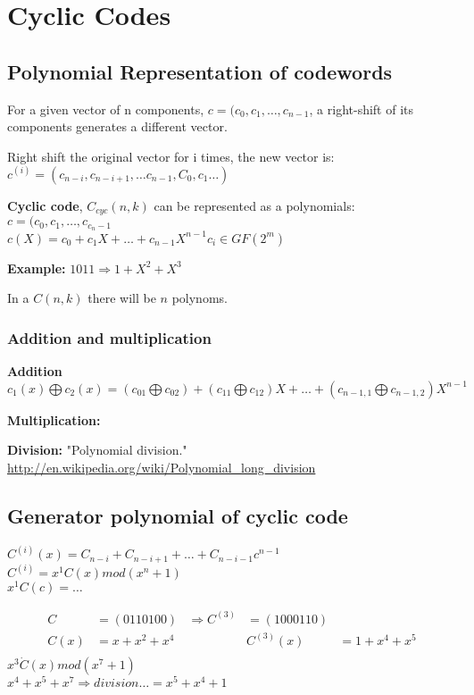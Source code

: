\documentclass[Main]{subfiles}
\begin{document}
 
\chapter{Cyclic Codes}

\section{Polynomial Representation of codewords}
For a given vector of n components, $c = (c_0 , c_1, \ldots, c_{n-1}$, a right-shift of its components generates a different vector.

Right shift the original vector for i times, the new vector is:
\\
$c^{(i)} = (c_{n-i}, c_{n-i+1}, \ldots c_{n-1}, C_0, c_1 \ldots)$

\textbf{Cyclic code}, $C_{cyc}(n,k)$ can be represented as a polynomials:
\\
$c=(c_0,c_1,\ldots, c_{c_n-1}$
\\
$c(X) = c_0 +c_1X + \ldots + c_{n-1}X^{n-1} c_i \in GF(2^m)$

\textbf{Example:}
$1 0 1 1 \Rightarrow 1+X^2+X^3$

In a $C(n, k)$ there will be $n$ polynoms.

\subsection{Addition and multiplication}
\textbf{Addition}\cite[p. 6-7]{Slide7}\\
$c_1(x) \bigoplus c_2(x) = (c_01 \bigoplus c_02) + (c_11 \bigoplus c_12)X + \ldots + (c_{n-1,1} \bigoplus c_{n-1,2})X^{n-1}$


\textbf{Multiplication:}\cite[p. 6-7]{Slide7}


\textbf{Division:}\cite[p. 9]{Slide7} 
"Polynomial division." \url{http://en.wikipedia.org/wiki/Polynomial_long_division}


\section{Generator polynomial of cyclic code}
\cite[p. 10-11]{Slide7}
$C^{(i)}(x) = C_{n-i} + C_{n-i+1} + \ldots + C_{n-i-1}c^{n-1}$
\\
$C^{(i)} = x^1C(x) mod (x^n+1)$
\\
$x^1C(c) = \ldots$

\begin{align*}
C &= (0 1 1 0 1 0 0) &\Rightarrow C^{(3)} &= (1 0 0 0 1 1 0)\\
C(x) &= x+ x^2 +x^4 & &C^{(3)}(x) &= 1+x^4+x^5\\
\end{align*}
$x^3 \dot C(x) mod (x^7+1)$
\\
$x^4+x^5+x^7 \Rightarrow division\ldots = x^5+x^4+1$
\end{document}
